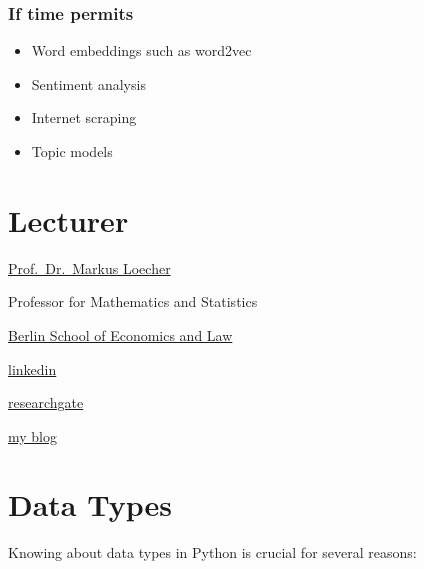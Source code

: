 \documentclass[
  letterpaper,
  DIV=11,
  numbers=noendperiod]{scrreprt}
\providecommand{\tightlist}{%
  \setlength{\itemsep}{0pt}\setlength{\parskip}{0pt}}\usepackage{longtable,booktabs,array}
\begin{document}
\hypertarget{if-time-permits}{%
\subsection*{If time permits}\label{if-time-permits}}

\begin{itemize}
\tightlist
\item
  Word embeddings such as word2vec\\
\item
  Sentiment analysis
\item
  Internet scraping
\item
  Topic models
\end{itemize}


\hypertarget{lecturer}{%
\chapter*{Lecturer}\label{lecturer}}

\href{http://www.hwr-berlin.de/fachbereich-wirtschaftswissenschaften/kontakt/personen/kontakt-info/2184/}{Prof.~Dr.~Markus
Loecher}

Professor for Mathematics and Statistics

\href{http://www.hwr-berlin.de}{Berlin School of Economics and Law}

\href{https://www.linkedin.com/in/loecher/}{linkedin}

\href{https://www.researchgate.net/profile/Markus-Loecher}{researchgate}

\href{https://markusloecher.github.io/}{my blog}


\hypertarget{data-types}{%
\chapter{Data Types}\label{data-types}}

Knowing about data types in Python is crucial for several reasons:
\end{document}
